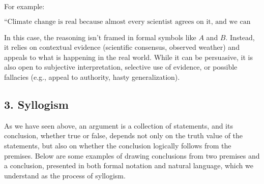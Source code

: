 For example:

\(\text{“Climate change is real because almost every scientist agrees on it, and we can see unusual weather patterns happening more frequently.”}\)

In this case, the reasoning isn't framed in formal symbols like \(𝐴\)
and \(𝐵\). Instead, it relies on contextual evidence (scientific
consensus, observed weather) and appeals to what is happening in the
real world. While it can be persuasive, it is also open to subjective
interpretation, selective use of evidence, or possible fallacies (e.g.,
appeal to authority, hasty generalization).

\subsection{3. Syllogism}\label{syllogism}

As we have seen above, an argument is a collection of statements, and
its conclusion, whether true or false, depends not only on the truth
value of the statements, but also on whether the conclusion logically
follows from the premises. Below are some examples of drawing
conclusions from two premises and a conclusion, presented in both formal
notation and natural language, which we understand as the process of
syllogism.

